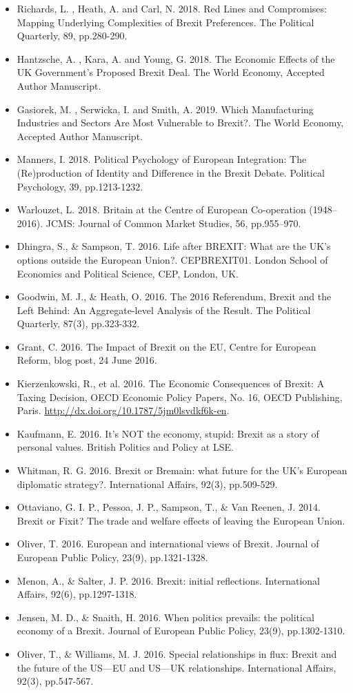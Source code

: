 \begin{itemize}
	\item Richards, L. , Heath, A. and Carl, N. 2018. Red Lines and Compromises: Mapping Underlying Complexities of Brexit Preferences. The Political Quarterly, 89, pp.280-290.
	\item Hantzsche, A. , Kara, A. and Young, G. 2018. The Economic Effects of the UK Government's Proposed Brexit Deal. The World Economy, Accepted Author Manuscript.
	\item Gasiorek, M. , Serwicka, I. and Smith, A. 2019. Which Manufacturing Industries and Sectors Are Most Vulnerable to Brexit?. The World Economy, Accepted Author Manuscript.
	\item Manners, I. 2018. Political Psychology of European Integration: The (Re)production of Identity and Difference in the Brexit Debate. Political Psychology, 39, pp.1213-1232.
	\item Warlouzet, L. 2018. Britain at the Centre of European Co-operation (1948–2016). JCMS: Journal of Common Market Studies, 56, pp.955–970.
	\item Dhingra, S., \& Sampson, T. 2016. Life after BREXIT: What are the UK’s options outside the European Union?. CEPBREXIT01. London School of Economics and Political Science, CEP, London, UK.
	\item Goodwin, M. J., \& Heath, O. 2016. The 2016 Referendum, Brexit and the Left Behind: An Aggregate-level Analysis of the Result. The Political Quarterly, 87(3), pp.323-332.
	\item Grant, C. 2016. The Impact of Brexit on the EU, Centre for European Reform, blog post, 24 June 2016. 
	\item Kierzenkowski, R., et al. 2016. The Economic Consequences of Brexit: A Taxing Decision, OECD Economic Policy Papers, No. 16, OECD Publishing, Paris.
	\url{http://dx.doi.org/10.1787/5jm0lsvdkf6k-en}.
	\item Kaufmann, E. 2016. It’s NOT the economy, stupid: Brexit as a story of personal values. British Politics and Policy at LSE.
	\item Whitman, R. G. 2016. Brexit or Bremain: what future for the UK's European diplomatic strategy?. International Affairs, 92(3), pp.509-529.
	\item Ottaviano, G. I. P., Pessoa, J. P., Sampson, T., \& Van Reenen, J. 2014. Brexit or Fixit? The trade and welfare effects of leaving the European Union.
	\item Oliver, T. 2016. European and international views of Brexit. Journal of European Public Policy, 23(9), pp.1321-1328.
	\item Menon, A., \& Salter, J. P. 2016. Brexit: initial reflections. International Affairs, 92(6), pp.1297-1318.
	\item Jensen, M. D., \& Snaith, H. 2016. When politics prevails: the political economy of a Brexit. Journal of European Public Policy, 23(9), pp.1302-1310.
	\item Oliver, T., \& Williams, M. J. 2016. Special relationships in flux: Brexit and the future of the US—EU and US—UK relationships. International Affairs, 92(3), pp.547-567.
\end{itemize}